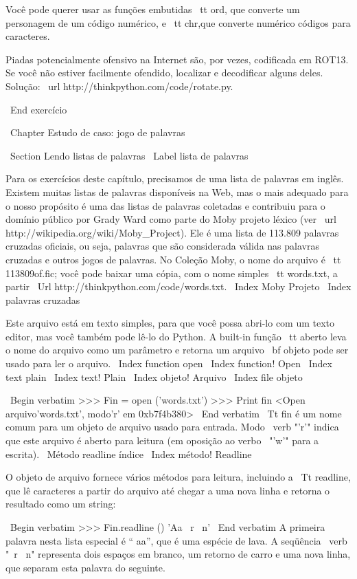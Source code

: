 \documentclass[10pt]{book}
\begin{document}
{{{{{{Você pode querer usar as funções embutidas {\ tt ord}, ​​que converte
um personagem de um código numérico, e {\ tt chr}, ​​que converte numérico
códigos para caracteres.

Piadas potencialmente ofensivo na Internet são, por vezes, codificada
em ROT13. Se você não estiver facilmente ofendido, localizar e decodificar alguns
deles. Solução: \ url {http://thinkpython.com/code/rotate.py}.

\ End {} exercício


\ Chapter {Estudo de caso: jogo de palavras}

\ Section {Lendo listas de palavras}
\ Label {lista de palavras}

Para os exercícios deste capítulo, precisamos de uma lista de palavras em inglês.
Existem muitas listas de palavras disponíveis na Web, mas o mais
adequado para o nosso propósito é uma das listas de palavras coletadas e
contribuiu para o domínio público por Grady Ward como parte do Moby
projeto léxico (ver \ url {http://wikipedia.org/wiki/Moby_Project}). Ele
é uma lista de 113.809 palavras cruzadas oficiais, ou seja, palavras que são
considerada válida nas palavras cruzadas e outros jogos de palavras. No
Coleção Moby, o nome do arquivo é {\ tt 113809of.fic}; você pode baixar
uma cópia, com o nome simples {\ tt words.txt}, a partir
\ Url {http://thinkpython.com/code/words.txt}.
\ Index {Moby Projeto}
\ Index {} palavras cruzadas

Este arquivo está em texto simples, para que você possa abri-lo com um texto
editor, mas você também pode lê-lo do Python. A built-in
função {\ tt aberto} leva o nome do arquivo como um parâmetro
e retorna um arquivo {\ bf objeto} pode ser usado para ler o arquivo.
\ Index {function open}
\ Index {function! Open}
\ Index {text plain}
\ Index {text! Plain}
\ Index {objeto! Arquivo}
\ Index {file objeto}

\ Begin {verbatim}
>>> Fin = open ('words.txt')
>>> Print fin
<Open arquivo'words.txt', modo'r' em 0xb7f4b380>
\ End {verbatim}
%
{\ Tt fin} é um nome comum para um objeto de arquivo usado para
entrada. Modo \ verb "'r'" indica que este arquivo é aberto para
leitura (em oposição ao verbo \ "'w'" para a escrita).
\ {Método readline} índice
\ Index {método! Readline}

O objeto de arquivo fornece vários métodos para leitura, incluindo a
{\ Tt readline}, que lê caracteres a partir do arquivo
até chegar a uma nova linha e retorna o resultado como um
string:

\ Begin {verbatim}
>>> Fin.readline ()
'Aa \ r \ n'
\ End {verbatim}
%
A primeira palavra nesta lista especial é `` aa'', que é uma espécie de
lava. A seqüência \ verb "\ r \ n" representa dois espaços em branco,
um retorno de carro e uma nova linha, que separam esta palavra do
seguinte.

}}}}}}
\end{document}
